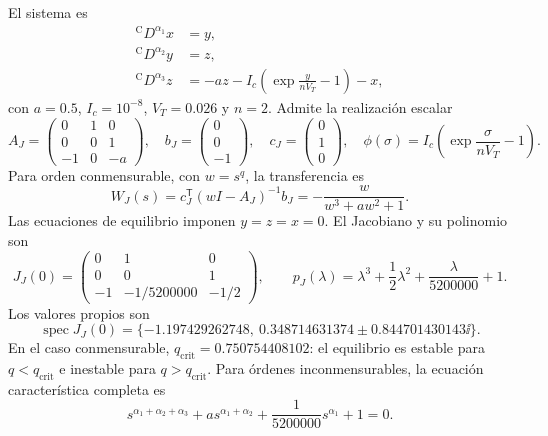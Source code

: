 El sistema es
\begin{equation}
\begin{aligned}
 {}^{\mathrm C}D^{\alpha_1}x&=y,\\
 {}^{\mathrm C}D^{\alpha_2}y&=z,\\
 {}^{\mathrm C}D^{\alpha_3}z&=-az-I_c
 \left(\exp\frac{y}{nV_T}-1\right)-x,
\end{aligned}
\label{ncbench:eq:jerk}
\end{equation}
con \(a=0.5\), \(I_c=10^{-8}\), \(V_T=0.026\) y \(n=2\). Admite la
realización escalar
\begin{equation}
 A_J=\begin{pmatrix}0&1&0\\0&0&1\\-1&0&-a\end{pmatrix},\quad
 b_J=\begin{pmatrix}0\\0\\-1\end{pmatrix},\quad
 c_J=\begin{pmatrix}0\\1\\0\end{pmatrix},\quad
 \phi(\sigma)=I_c\left(\exp\frac{\sigma}{nV_T}-1\right).
\end{equation}
Para orden conmensurable, con \(w=s^q\), la transferencia es
\begin{equation}
 W_J(s)=c_J^{\mathsf T}(wI-A_J)^{-1}b_J
 =-\frac{w}{w^3+aw^2+1}.
\end{equation}
Las ecuaciones de equilibrio imponen \(y=z=x=0\). El Jacobiano y su polinomio
son
\begin{equation}
 J_J(0)=\begin{pmatrix}
 0&1&0\\0&0&1\\-1&-1/5200000&-1/2
 \end{pmatrix},\qquad
 p_J(\lambda)=\lambda^3+\frac12\lambda^2
 +\frac{\lambda}{5200000}+1.
\end{equation}
Los valores propios son
\begin{equation}
 \operatorname{spec}J_J(0)=
 \{-1.197429262748,\ 0.348714631374
 \pm0.844701430143\ii\}.
\end{equation}
En el caso conmensurable, \(q_{\mathrm{crit}}=0.750754408102\): el equilibrio
es estable para \(q<q_{\mathrm{crit}}\) e inestable para
\(q>q_{\mathrm{crit}}\). Para órdenes inconmensurables, la ecuación
característica completa es
\begin{equation}
 s^{\alpha_1+\alpha_2+\alpha_3}
 +a s^{\alpha_1+\alpha_2}
 +\frac{1}{5200000}s^{\alpha_1}+1=0.
\end{equation}

